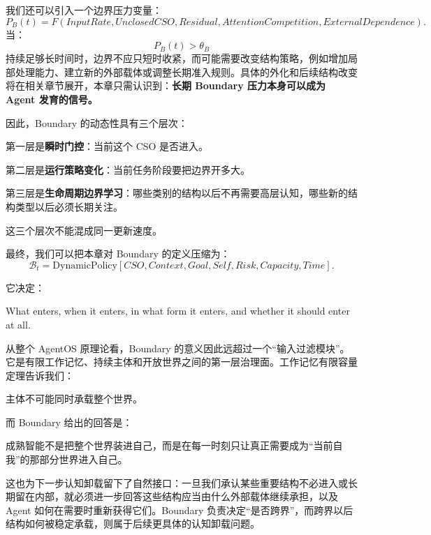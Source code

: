 我们还可以引入一个边界压力变量：
\[
P_B(t)
=
F
\left(
InputRate,
UnclosedCSO,
Residual,
AttentionCompetition,
ExternalDependence
\right).
\]
当：
\[
P_B(t)>\theta_B
\]
持续足够长时间时，边界不应只短时收紧，而可能需要改变结构策略，例如增加局部处理能力、建立新的外部载体或调整长期准入规则。具体的外化和后续结构改变将在相关章节展开，本章只需认识到：\textbf{长期 Boundary 压力本身可以成为 Agent 发育的信号。}

因此，Boundary 的动态性具有三个层次：

第一层是\textbf{瞬时门控}：当前这个 CSO 是否进入。

第二层是\textbf{运行策略变化}：当前任务阶段要把边界开多大。

第三层是\textbf{生命周期边界学习}：哪些类别的结构以后不再需要高层认知，哪些新的结构类型以后必须长期关注。

这三个层次不能混成同一更新速度。

最终，我们可以把本章对 Boundary 的定义压缩为：
\[
\boxed{
\mathcal B_t
=
\text{DynamicPolicy}
\left[
CSO,
Context,
Goal,
Self,
Risk,
Capacity,
Time
\right].
}
\]

它决定：
\begin{statementbox}
What enters, when it enters, in what form it enters,
and whether it should enter at all.
\end{statementbox}

从整个 AgentOS 原理论看，Boundary 的意义因此远超过一个“输入过滤模块”。它是有限工作记忆、持续主体和开放世界之间的第一层治理面。工作记忆有限容量定理告诉我们：
\begin{proposition*}
主体不可能同时承载整个世界。
\end{proposition*}
而 Boundary 给出的回答是：
\begin{statementbox}
成熟智能不是把整个世界装进自己，而是在每一时刻只让真正需要成为“当前自我”的那部分世界进入自己。
\end{statementbox}

这也为下一步认知卸载留下了自然接口：一旦我们承认某些重要结构不必进入或长期留在内部，就必须进一步回答这些结构应当由什么外部载体继续承担，以及 Agent 如何在需要时重新获得它们。Boundary 负责决定“是否跨界”，而跨界以后结构如何被稳定承载，则属于后续更具体的认知卸载问题。
